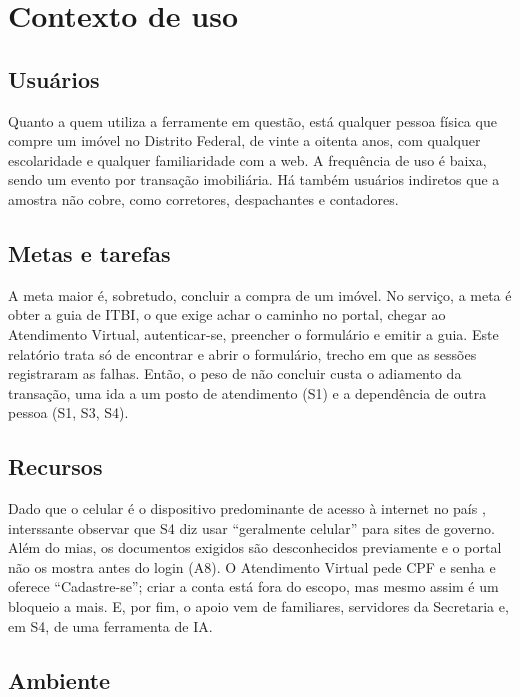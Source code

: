 \documentclass[
  12pt,
  oneside,
  a4paper,
  chapter=TITLE,
  section=TITLE,
  english,
  brazilian
]{abntex2}
\begin{document}
\chapter{Contexto de uso}\label{cap:contexto}

\section{Usuários}

Quanto a quem utiliza a ferramente em questão, está qualquer pessoa física que compre um imóvel no Distrito Federal, de vinte a
oitenta anos, com qualquer escolaridade e qualquer familiaridade com a web. A frequência de uso é baixa, sendo um evento por
transação imobiliária. Há
também usuários indiretos que a amostra não cobre, como corretores, despachantes
e contadores.

\section{Metas e tarefas}

A meta maior é, sobretudo, concluir a compra de um imóvel. No serviço, a meta é obter a
guia de ITBI, o que exige achar o caminho no portal, chegar ao
Atendimento Virtual, autenticar-se, preencher o formulário e emitir a guia. Este
relatório trata só de encontrar e abrir o formulário, trecho em que as sessões
registraram as falhas. Então, o peso de não concluir custa o adiamento da transação, uma ida a um
posto de atendimento (S1) e a dependência de outra pessoa (S1, S3, S4).

\section{Recursos}\label{sec:recursos}

Dado que o celular é o dispositivo predominante de acesso à internet no país
\cite{ticdomicilios}, interssante observar que S4 diz usar ``geralmente celular'' para sites de governo.
Além do mias, os documentos exigidos
são desconhecidos previamente e o portal não os mostra antes do login (A8). O
Atendimento Virtual pede CPF e senha e oferece ``Cadastre-se''; criar a conta
está fora do escopo, mas mesmo assim é um bloqueio a mais. E, por fim, o apoio vem de familiares,
servidores da Secretaria e, em S4, de uma ferramenta de IA.

\section{Ambiente}
\end{document}
